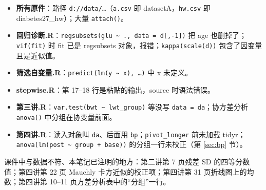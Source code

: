 \begin{itemize}
\item \textbf{所有原件}：路径 \Verb|d://data/…|（\Verb|a.csv| 即 datasetA，\Verb|hw.csv| 即 diabetes27\_hw）；大量 \Verb|attach()|。
\item \textbf{回归诊断.R}：\Verb|regsubsets(glu ~ ., data = d[,-1])| 把 age 也删掉了；\Verb|vif(fit)| 时 fit 已是 regsubsets 对象，报错；\Verb|kappa(scale(d))| 包含了因变量且是近似值。
\item \textbf{筛选自变量.R}：\Verb|predict(lm(y ~ x), …)| 中 x 未定义。
\item \textbf{stepwise.R}：第 17–18 行是粘贴的输出，source 时语法错误。
\item \textbf{第三讲.R}：\Verb|var.test(bwt ~ lwt_group)| 等没写 \Verb|data = da|；协方差分析 \Verb|anova()| 中分组在协变量前面。
\item \textbf{第四讲.R}：读入对象叫 \Verb|da|、后面用 \Verb|bp|；\Verb|pivot_longer| 前未加载 tidyr；\Verb|anova(lm(post ~ group + base))| 的分组一行未校正（第 \ref{sec:bp} 节）。
\end{itemize}

课件中与数据不符、本笔记已注明的地方：第二讲第 7 页残差 SD 的四等分数值；第四讲第 22 页 Mauchly 卡方近似的校正项；第四讲第 31 页折线图上的均数；第四讲第 10–11 页方差分析表中的“分组”一行。
